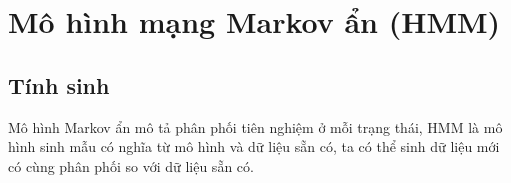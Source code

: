 \chapter{Mô hình mạng Markov ẩn (HMM)} 
\section{Tính sinh}
Mô hình Markov ẩn mô tả phân phối tiên nghiệm ở mỗi trạng thái, HMM là mô hình sinh mẫu có nghĩa từ mô hình và dữ liệu sẵn có, ta có thể sinh dữ liệu mới có cùng phân phối so với dữ liệu sẵn có.


